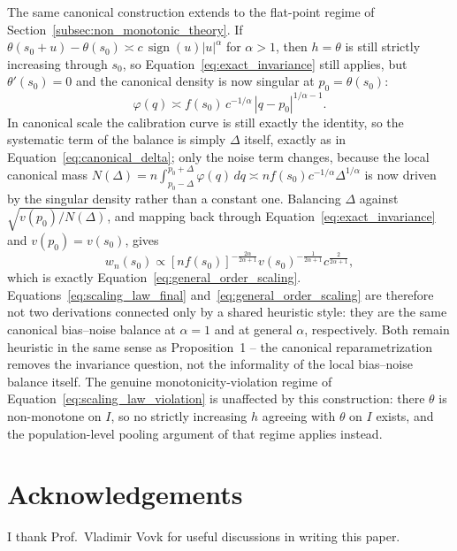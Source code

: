 \documentclass[11pt]{article}
\begin{document}
	The same canonical construction extends to the flat-point regime of Section~\ref{subsec:non_monotonic_theory}. If $\theta(s_0+u)-\theta(s_0)\asymp c\,\operatorname{sign}(u)|u|^{\alpha}$ for $\alpha>1$, then $h=\theta$ is still strictly increasing through $s_0$, so Equation~\ref{eq:exact_invariance} still applies, but $\theta'(s_0)=0$ and the canonical density is now singular at $p_0=\theta(s_0)$:
	\begin{equation}
		\varphi(q) \asymp f(s_0)\,c^{-1/\alpha}\,|q-p_0|^{1/\alpha-1}.
		\label{eq:singular_density}
	\end{equation}
	In canonical scale the calibration curve is still exactly the identity, so the systematic term of the balance is simply $\Delta$ itself, exactly as in Equation~\ref{eq:canonical_delta}; only the noise term changes, because the local canonical mass $N(\Delta)=n\int_{p_0-\Delta}^{p_0+\Delta}\varphi(q)\,dq \asymp nf(s_0)c^{-1/\alpha}\Delta^{1/\alpha}$ is now driven by the singular density rather than a constant one. Balancing $\Delta$ against $\sqrt{v(p_0)/N(\Delta)}$, and mapping back through Equation~\ref{eq:exact_invariance} and $v(p_0)=v(s_0)$, gives
	\begin{equation}
		w_n(s_0) \propto [nf(s_0)]^{-\frac{2\alpha}{2\alpha+1}}v(s_0)^{-\frac{1}{2\alpha+1}}c^{\frac{2}{2\alpha+1}},
	\end{equation}
	which is exactly Equation~\ref{eq:general_order_scaling}. Equations~\ref{eq:scaling_law_final} and~\ref{eq:general_order_scaling} are therefore not two derivations connected only by a shared heuristic style: they are the same canonical bias--noise balance at $\alpha=1$ and at general $\alpha$, respectively. Both remain heuristic in the same sense as Proposition~1 -- the canonical reparametrization removes the invariance question, not the informality of the local bias--noise balance itself. The genuine monotonicity-violation regime of Equation~\ref{eq:scaling_law_violation} is unaffected by this construction: there $\theta$ is non-monotone on $I$, so no strictly increasing $h$ agreeing with $\theta$ on $I$ exists, and the population-level pooling argument of that regime applies instead.

	\section*{Acknowledgements}

	I thank Prof.\ Vladimir Vovk for useful discussions in writing this paper.
\end{document}
